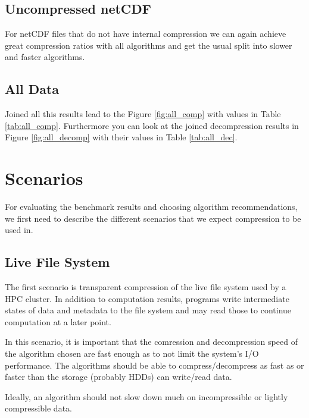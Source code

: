 \documentclass[
	12pt,
	a4paper,
	BCOR10mm,
	DIV14,
	listof=totoc,
	bibliography=totoc,
	headsepline
]{scrreprt}
\begin{document}
\FloatBarrier
\subsection{Uncompressed netCDF}
\FloatBarrier


For netCDF files that do not have internal compression we can again achieve great compression ratios with all algorithms and get the usual split into slower and faster algorithms.





\FloatBarrier
\subsection{All Data}
\FloatBarrier


Joined all this results lead to the Figure \ref{fig:all_comp} with values in Table \ref{tab:all_comp}.
Furthermore you can look at the joined decompression results in Figure \ref{fig:all_decomp} with their values in Table \ref{tab:all_dec}.
\FloatBarrier

\section{Scenarios}
\label{Scenarios}

For evaluating the benchmark results and choosing algorithm recommendations, we first need to describe the different scenarios that we expect compression to be used in.

\subsection{Live File System}

The first scenario is transparent compression of the live file system used by a HPC cluster. In addition to computation results, programs write intermediate states of data and metadata to the file system and may read those to continue computation at a later point.

In this scenario, it is important that the comression and decompression speed of the algorithm chosen are fast enough as to not limit the system's I/O performance.  The algorithms should be able to compress/decompress as fast as or faster than the storage (probably HDDs) can write/read data.

Ideally, an algorithm should not slow down much on incompressible or lightly compressible data.
\end{document}
